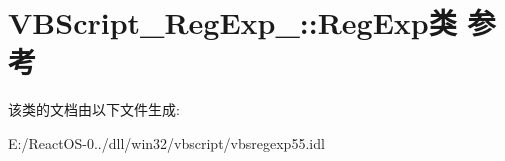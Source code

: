 \hypertarget{class_v_b_script___reg_exp__55_1_1_reg_exp}{}\section{V\+B\+Script\+\_\+\+Reg\+Exp\+\_\+:\+:Reg\+Exp类 参考}
\label{class_v_b_script___reg_exp__55_1_1_reg_exp}


该类的文档由以下文件生成\+:\begin{DoxyCompactItemize}
\item 
E\+:/\+React\+O\+S-\/0../dll/win32/vbscript/vbsregexp55.\+idl\end{DoxyCompactItemize}
